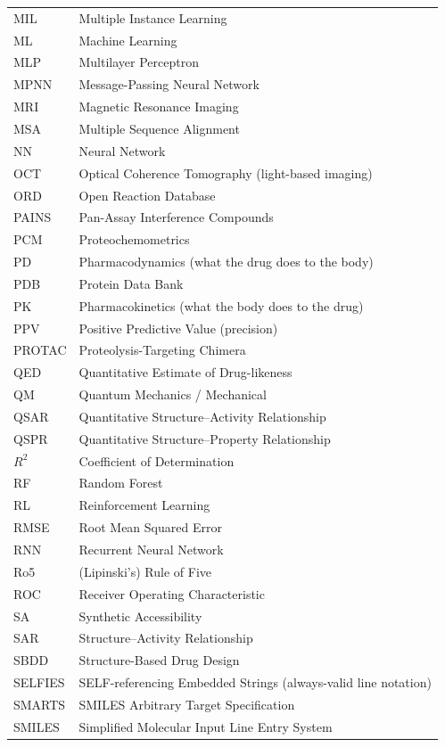 \documentclass[11pt, oneside]{book}
\begin{document}
\begin{longtable}{@{}p{}p{}@{}}
MIL & Multiple Instance Learning \\
ML & Machine Learning \\
MLP & Multilayer Perceptron \\
MPNN & Message-Passing Neural Network \\
MRI & Magnetic Resonance Imaging \\
MSA & Multiple Sequence Alignment \\
NN & Neural Network \\
OCT & Optical Coherence Tomography (light-based imaging) \\
ORD & Open Reaction Database \\
PAINS & Pan-Assay Interference Compounds \\
PCM & Proteochemometrics \\
PD & Pharmacodynamics (what the drug does to the body) \\
PDB & Protein Data Bank \\
PK & Pharmacokinetics (what the body does to the drug) \\
PPV & Positive Predictive Value (precision) \\
PROTAC & Proteolysis-Targeting Chimera \\
QED & Quantitative Estimate of Drug-likeness \\
QM & Quantum Mechanics / Mechanical \\
QSAR & Quantitative Structure--Activity Relationship \\
QSPR & Quantitative Structure--Property Relationship \\
$R^2$ & Coefficient of Determination \\
RF & Random Forest \\
RL & Reinforcement Learning \\
RMSE & Root Mean Squared Error \\
RNN & Recurrent Neural Network \\
Ro5 & (Lipinski's) Rule of Five \\
ROC & Receiver Operating Characteristic \\
SA & Synthetic Accessibility \\
SAR & Structure--Activity Relationship \\
SBDD & Structure-Based Drug Design \\
SELFIES & SELF-referencing Embedded Strings (always-valid line notation) \\
SMARTS & SMILES Arbitrary Target Specification \\
SMILES & Simplified Molecular Input Line Entry System \\

\end{longtable}
\end{document}
